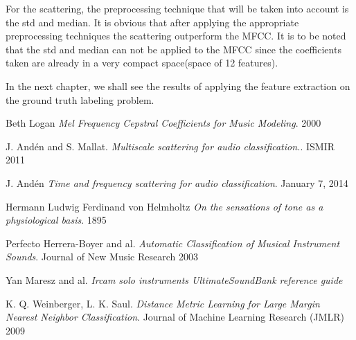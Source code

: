 \documentclass[hidelinks,12pt]{report}
\begin{document}
For the scattering, the preprocessing technique that will be taken into account is the std and median. It is obvious that after applying the appropriate preprocessing techniques the scattering outperform the MFCC. It is to be noted that the std and median can not be applied to the MFCC since the coefficients taken are already in a very compact space(space of 12 features). \par
In the next chapter, we shall see the results of applying the feature extraction on the ground truth labeling problem.
\newpage
\begin{thebibliography}{2}
Beth Logan
\textit{Mel Frequency Cepstral Coefficients for Music Modeling}. 
2000

J. Andén and S. Mallat. 
\textit{Multiscale scattering for audio classification.}. 
ISMIR 2011

J. Andén 
\textit{Time and frequency scattering for audio classification}. 
January 7, 2014

Hermann Ludwig Ferdinand von Helmholtz
\textit{On the sensations of tone as a physiological basis}.
1895


Perfecto Herrera-Boyer and al.
\textit{Automatic Classification of Musical Instrument Sounds}.
Journal of New Music Research 2003


Yan Maresz and al.
\textit{Ircam solo instruments UltimateSoundBank reference guide}

K. Q. Weinberger, L. K. Saul. 
\textit{Distance Metric Learning for Large Margin Nearest Neighbor Classification}.
Journal of Machine Learning Research (JMLR) 2009



\end{thebibliography}
\end{document}
